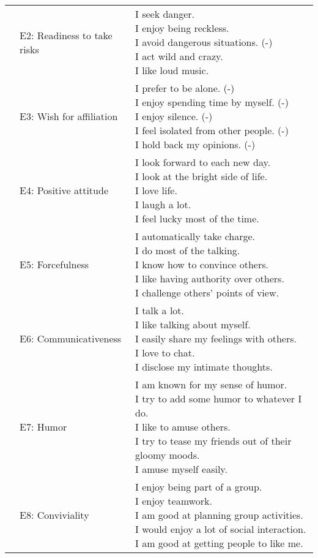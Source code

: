 \begin{appendix}
\begin{longtable}[t]{lll}
\addlinespace
 & E2: Readiness to take risks & \makecell[l]{I seek danger.\\I enjoy being reckless.\\I avoid dangerous situations. (-)\\I act wild and crazy.\\I like loud music.}\\
\addlinespace
 & E3: Wish for affiliation & \makecell[l]{I prefer to be alone. (-)\\I enjoy spending time by myself. (-)\\I enjoy silence. (-)\\I feel isolated from other people. (-)\\I hold back my opinions. (-)}\\
\addlinespace
 & E4: Positive attitude & \makecell[l]{I look forward to each new day.\\I look at the bright side of life.\\I love life.\\I laugh a lot.\\I feel lucky most of the time.}\\
\addlinespace
 & E5: Forcefulness & \makecell[l]{I automatically take charge.\\I do most of the talking.\\I know how to convince others.\\I like having authority over others.\\I challenge others’ points of view.}\\
\addlinespace
 & E6: Communicativeness & \makecell[l]{I talk a lot.\\I like talking about myself.\\I easily share my feelings with others.\\I love to chat.\\I disclose my intimate thoughts.}\\
\addlinespace
 & E7: Humor & \makecell[l]{I am known for my sense of humor.\\I try to add some humor to whatever I do.\\I like to amuse others.\\I try to tease my friends out of their gloomy moods.\\I amuse myself easily.}\\
\addlinespace
 & E8: Conviviality & \makecell[l]{I enjoy being part of a group.\\I enjoy teamwork.\\I am good at planning group activities.\\I would enjoy a lot of social interaction.\\I am good at getting people to like me.}\\

\end{longtable}
\end{appendix}
